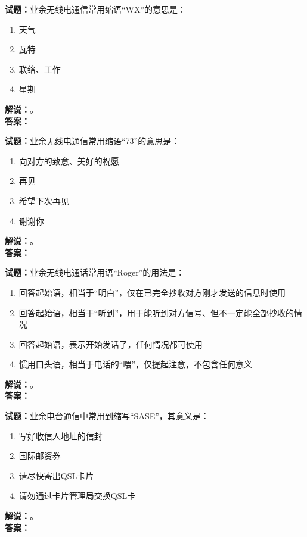 \documentclass{ctexbook}
\begin{document}
\bigskip

\noindent\textbf{试题：}业余无线电通信常用缩语“WX”的意思是：
\begin{enumerate}[leftmargin=3em]
  \item 天气
  \item 瓦特
  \item 联络、工作
  \item 星期
\end{enumerate}
\noindent\textbf{解说：}\textbf{}。\\\noindent\textbf{答案：}

\bigskip

\noindent\textbf{试题：}业余无线电通信常用缩语“73”的意思是：
\begin{enumerate}[leftmargin=3em]
  \item 向对方的致意、美好的祝愿
  \item 再见
  \item 希望下次再见
  \item 谢谢你
\end{enumerate}
\noindent\textbf{解说：}\textbf{}。\\\noindent\textbf{答案：}

\bigskip

\noindent\textbf{试题：}业余无线电通话常用语“Roger”的用法是：
\begin{enumerate}[leftmargin=3em]
  \item 回答起始语，相当于“明白”，仅在已完全抄收对方刚才发送的信息时使用
  \item 回答起始语，相当于“听到”，用于能听到对方信号、但不一定能全部抄收的情况
  \item 回答起始语，表示开始发话了，任何情况都可使用
  \item 惯用口头语，相当于电话的“喂”，仅提起注意，不包含任何意义
\end{enumerate}
\noindent\textbf{解说：}\textbf{}。\\\noindent\textbf{答案：}

\bigskip

\noindent\textbf{试题：}业余电台通信中常用到缩写“SASE”，其意义是：
\begin{enumerate}[leftmargin=3em]
  \item 写好收信人地址的信封
  \item 国际邮资券
  \item 请尽快寄出QSL卡片
  \item 请勿通过卡片管理局交换QSL卡
\end{enumerate}
\noindent\textbf{解说：}\textbf{}。\\\noindent\textbf{答案：}
\end{document}
